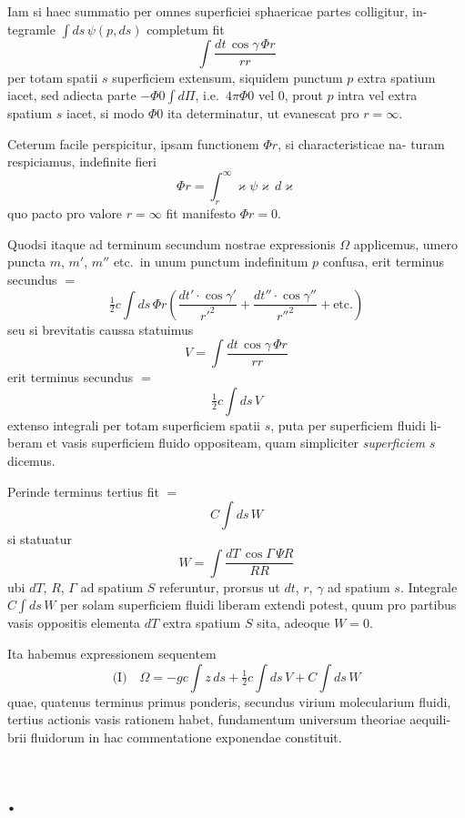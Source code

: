 \documentclass[12pt,a4paper]{article}
\theoremstyle{gauss}
\begin{document}
Iam si haec summatio per omnes superficiei sphaericae partes colligitur, in-
tegramle $\int ds\,\psi(p,ds)$ completum fit
\[
\int\frac{dt\,\cos\gamma\,\Phi r}{rr}
\]
per totam spatii $s$ superficiem extensum, siquidem punctum $p$ extra spatium
iacet, sed adiecta parte $-\Phi 0\int d\Pi$, i.e.~$4\pi\Phi 0$ vel $0$, prout $p$ intra vel extra
spatium $s$ iacet, si modo $\Phi 0$ ita determinatur, ut evanescat pro $r=\infty$.

\newpage
\setcounter{page}{39}

Ceterum facile perspicitur, ipsam functionem $\Phi r$, si characteristicae na-
turam respiciamus, indefinite fieri
\[
\Phi r = \int_r^{\infty} \varkappa\psi\varkappa\,d\varkappa
\]
quo pacto pro valore $r=\infty$ fit manifesto $\Phi r = 0$.

Quodsi itaque ad terminum secundum nostrae expressionis $\Omega$ applicemus,
umero puncta $m$, $m'$, $m''$ etc.~in unum punctum indefinitum $p$ confusa, erit
terminus secundus $=$
\[
\tfrac{1}{2}c\int ds\,\Phi r\left(\frac{dt'\cdot\cos\gamma'}{r'^2} + \frac{dt''\cdot\cos\gamma''}{r''^2} + \text{etc.}\right)
\]
seu si brevitatis caussa statuimus
\[
V = \int\frac{dt\,\cos\gamma\,\Phi r}{rr}
\]
erit terminus secundus $=$
\[
\tfrac{1}{2}c\int ds\,V
\]
extenso integrali per totam superficiem spatii $s$, puta per superficiem fluidi li-
beram et vasis superficiem fluido oppositeam, quam simpliciter \emph{superficiem} $s$ 
dicemus.

Perinde terminus tertius fit $=$
\[
C\int ds\,W
\]
si statuatur
\[
W = \int\frac{dT\,\cos\Gamma\,\Psi R}{RR}
\]
ubi $dT$, $R$, $\Gamma$ ad spatium $S$ referuntur, prorsus ut $dt$, $r$, $\gamma$ ad spatium $s$.
Integrale $C\int ds\,W$ per solam superficiem fluidi liberam extendi potest, quum
pro partibus vasis oppositis elementa $dT$ extra spatium $S$ sita, adeoque $W=0$.

Ita habemus expressionem sequentem
\[
\text{(I)}\quad \Omega = -gc\int z\,ds + \tfrac{1}{2}c\int ds\,V + C\int ds\,W
\]
quae, quatenus terminus primus ponderis, secundus virium molecularium fluidi,
tertius actionis vasis rationem habet, fundamentum universum theoriae aequili-
brii fluidorum in hac commentatione exponendae constituit.

\newpage
\setcounter{page}{40}

\section*{%
%
\thesection.}
\end{document}
